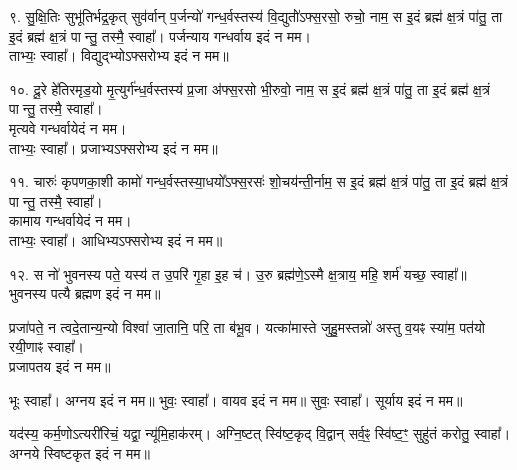 ९. सु॒क्षि॒तिः सुभू॑तिर्भद्र॒कृत् सुव॑र्वान् प॒र्जन्यो॑ गन्ध॒र्वस्तस्य॑ वि॒द्युतो॑॑ऽफ्स॒रसो॒ रुचो॒ नाम॒ स इ॒दं ब्रह्म॑ क्ष॒त्रं पा॑तु॒ ता इ॒दं ब्रह्म॑ क्ष॒त्रं पान्तु॒ तस्मै॒ स्वाहा᳚। पर्जन्याय गन्धर्वाय इदं न मम।\\
ताभ्यः॒ स्वाहा᳚। विद्युद्भ्योऽफ्सरोभ्य इदं न मम॥

१०. दू॒रे हे॑तिरमृड॒यो मृ॒त्युर्ग॑न्ध॒र्वस्तस्य॑ प्र॒जा अ॑फ्स॒रसो भी॒रुवो॒ नाम॒ स इ॒दं ब्रह्म॑ क्ष॒त्रं पा॑तु॒ ता इ॒दं ब्रह्म॑ क्ष॒त्रं पान्तु॒ तस्मै॒ स्वाहा᳚।\\
मृत्यवे गन्धर्वायेदं न मम।\\
ताभ्यः॒ स्वाहा᳚। प्रजाभ्यऽफ्सरोभ्य इदं न मम॥

११. चारुः॑ कृपणका॒शी कामो॑ गन्ध॒र्वस्तस्या॒धयो᳚ऽफ्स॒रसः॑ शो॒चय॑न्ती॒र्नाम॒ स इ॒दं ब्रह्म॑ क्ष॒त्रं पा॑तु॒ ता इ॒दं ब्रह्म॑ क्ष॒त्रं पान्तु॒ तस्मै॒ स्वाहा᳚।\\
कामाय गन्धर्वायेदं न मम।\\
ताभ्यः॒ स्वाहा᳚। आधिभ्यऽफ्सरोभ्य इदं न मम॥

१२. स नो॑ भुवनस्य पते॒ यस्य॑ त उ॒परि॑ गृ॒हा इ॒ह च॑।
उ॒रु ब्रह्म॑णे॒ऽस्मै क्ष॒त्राय॒ महि॒ शर्म॑ यच्छ॒ स्वाहा᳚॥\\
भुवनस्य पत्यै ब्रह्मण इदं न मम॥

प्रजा॑पते॒ न त्वदे॒तान्य॒न्यो विश्वा॑ जा॒तानि॒ परि॒ ता ब॑भू॒व।
यत्का॑मास्ते जुहु॒मस्तन्नो॑ अस्तु व॒यꣴ स्या॑म॒ पत॑यो रयी॒णाꣴ स्वाहा᳚।\\
प्रजापतय इदं न मम॥

भूः स्वाहा᳚। अग्नय इदं न मम॥
भुवः॒ स्वाहा᳚। वायव इदं न मम॥
सुवः॒ स्वाहा᳚। सूर्याय इदं न मम॥

यद॑स्य॒ कर्म॒णोऽत्यरी॑रिचं॒ यद्वा॒ न्यू॑मि॒हाक॑रम्। अग्नि॒ष्टत् स्वि॑ष्ट॒कृद् वि॒द्वान् सर्व॒ꣴ॒ स्वि॑ष्ट॒ꣳ॒ सुहु॑तं करोतु॒ स्वाहा᳚। अग्नये स्विष्टकृत इदं न मम॥
